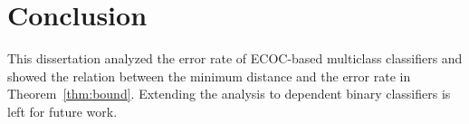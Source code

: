 \chapter{Conclusion}\label{chap:conclusion}

This dissertation analyzed the error rate of ECOC-based multiclass
classifiers and showed the relation between the minimum distance and the
error rate in Theorem~\ref{thm:bound}. Extending the analysis to dependent
binary classifiers is left for future work.
